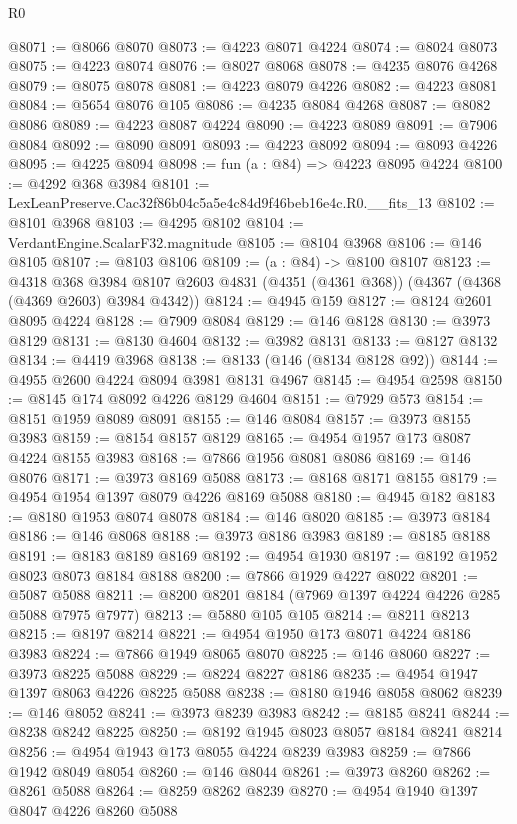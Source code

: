 \begin{lexlean}{R0}
\begin{coremodule}
@8071 := @8066 @8070
@8073 := @4223 @8071 @4224
@8074 := @8024 @8073
@8075 := @4223 @8074
@8076 := @8027 @8068
@8078 := @4235 @8076 @4268
@8079 := @8075 @8078
@8081 := @4223 @8079 @4226
@8082 := @4223 @8081
@8084 := @5654 @8076 @105
@8086 := @4235 @8084 @4268
@8087 := @8082 @8086
@8089 := @4223 @8087 @4224
@8090 := @4223 @8089
@8091 := @7906 @8084
@8092 := @8090 @8091
@8093 := @4223 @8092
@8094 := @8093 @4226
@8095 := @4225 @8094
@8098 := fun (a : @84) => @4223 @8095 @4224
@8100 := @4292 @368 @3984
@8101 := LexLeanPreserve.Cac32f86b04c5a5e4c84d9f46beb16e4c.R0.__fits_13
@8102 := @8101 @3968
@8103 := @4295 @8102
@8104 := VerdantEngine.ScalarF32.magnitude
@8105 := @8104 @3968
@8106 := @146 @8105
@8107 := @8103 @8106
@8109 := (a : @84) -> @8100 @8107
@8123 := @4318
    @368
    @3984
    @8107
    @2603
    @4831
    (@4351 (@4361 @368))
    (@4367 (@4368 (@4369 @2603) @3984 @4342))
@8124 := @4945 @159
@8127 := @8124 @2601 @8095 @4224
@8128 := @7909 @8084
@8129 := @146 @8128
@8130 := @3973 @8129
@8131 := @8130 @4604
@8132 := @3982 @8131
@8133 := @8127 @8132
@8134 := @4419 @3968
@8138 := @8133 (@146 (@8134 @8128 @92))
@8144 := @4955 @2600 @4224 @8094 @3981 @8131 @4967
@8145 := @4954 @2598
@8150 := @8145 @174 @8092 @4226 @8129 @4604
@8151 := @7929 @573
@8154 := @8151 @1959 @8089 @8091
@8155 := @146 @8084
@8157 := @3973 @8155 @3983
@8159 := @8154 @8157 @8129
@8165 := @4954 @1957 @173 @8087 @4224 @8155 @3983
@8168 := @7866 @1956 @8081 @8086
@8169 := @146 @8076
@8171 := @3973 @8169 @5088
@8173 := @8168 @8171 @8155
@8179 := @4954 @1954 @1397 @8079 @4226 @8169 @5088
@8180 := @4945 @182
@8183 := @8180 @1953 @8074 @8078
@8184 := @146 @8020
@8185 := @3973 @8184
@8186 := @146 @8068
@8188 := @3973 @8186 @3983
@8189 := @8185 @8188
@8191 := @8183 @8189 @8169
@8192 := @4954 @1930
@8197 := @8192 @1952 @8023 @8073 @8184 @8188
@8200 := @7866 @1929 @4227 @8022
@8201 := @5087 @5088
@8211 := @8200 @8201 @8184 (@7969 @1397 @4224 @4226 @285 @5088 @7975 @7977)
@8213 := @5880 @105 @105
@8214 := @8211 @8213
@8215 := @8197 @8214
@8221 := @4954 @1950 @173 @8071 @4224 @8186 @3983
@8224 := @7866 @1949 @8065 @8070
@8225 := @146 @8060
@8227 := @3973 @8225 @5088
@8229 := @8224 @8227 @8186
@8235 := @4954 @1947 @1397 @8063 @4226 @8225 @5088
@8238 := @8180 @1946 @8058 @8062
@8239 := @146 @8052
@8241 := @3973 @8239 @3983
@8242 := @8185 @8241
@8244 := @8238 @8242 @8225
@8250 := @8192 @1945 @8023 @8057 @8184 @8241 @8214
@8256 := @4954 @1943 @173 @8055 @4224 @8239 @3983
@8259 := @7866 @1942 @8049 @8054
@8260 := @146 @8044
@8261 := @3973 @8260
@8262 := @8261 @5088
@8264 := @8259 @8262 @8239
@8270 := @4954 @1940 @1397 @8047 @4226 @8260 @5088

\end{coremodule}
\end{lexlean}
